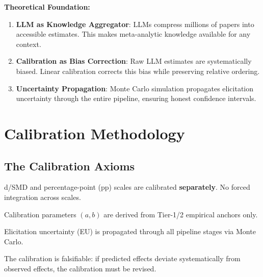 \textbf{Theoretical Foundation:}
\begin{enumerate}
\item \textbf{LLM as Knowledge Aggregator}: LLMs compress millions of papers into
accessible estimates. This makes meta-analytic knowledge available for any context.
\item \textbf{Calibration as Bias Correction}: Raw LLM estimates are systematically
biased. Linear calibration corrects this bias while preserving relative ordering.
\item \textbf{Uncertainty Propagation}: Monte Carlo simulation propagates elicitation
uncertainty through the entire pipeline, ensuring honest confidence intervals.
\end{enumerate}


\section{Calibration Methodology}
\label{sec:iii-calibration}

\subsection{The Calibration Axioms}

\begin{tcolorbox}[colback=red!5!white, colframe=red!75!black,
    title=Axiom CAL-1: Scale-Local Calibration]
d/SMD and percentage-point (pp) scales are calibrated \textbf{separately}.
No forced integration across scales.
\end{tcolorbox}

\begin{tcolorbox}[colback=red!5!white, colframe=red!75!black,
    title=Axiom CAL-2: Empirical Anchoring]
Calibration parameters $(a, b)$ are derived from Tier-1/2 empirical anchors only.
\end{tcolorbox}

\begin{tcolorbox}[colback=red!5!white, colframe=red!75!black,
    title=Axiom CAL-3: Uncertainty Propagation]
Elicitation uncertainty (EU) is propagated through all pipeline stages via Monte Carlo.
\end{tcolorbox}

\begin{tcolorbox}[colback=red!5!white, colframe=red!75!black,
    title=Axiom CAL-4: Falsifiability]
The calibration is falsifiable: if predicted effects deviate systematically from
observed effects, the calibration must be revised.
\end{tcolorbox}

